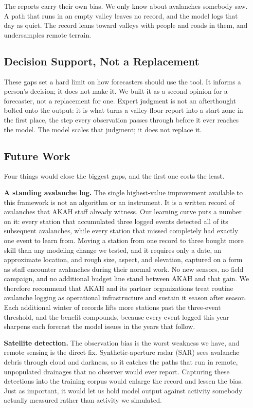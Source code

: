 \documentclass{issw}
\begin{document}
The reports carry their own bias. We only know about avalanches somebody saw. A path that runs in an empty valley leaves no record, and the model logs that day as quiet. The record leans toward valleys with people and roads in them, and undersamples remote terrain.

\subsection{Decision Support, Not a Replacement}
These gaps set a hard limit on how forecasters should use the tool. It informs a person's decision; it does not make it. We built it as a second opinion for a forecaster, not a replacement for one. Expert judgment is not an afterthought bolted onto the output: it is what turns a valley-floor report into a start zone in the first place, the step every observation passes through before it ever reaches the model. The model scales that judgment; it does not replace it.

\subsection{Future Work}
Four things would close the biggest gaps, and the first one costs the least.

\textbf{A standing avalanche log.} The single highest-value improvement available to this framework is not an algorithm or an instrument. It is a written record of avalanches that AKAH staff already witness. Our learning curve puts a number on it: every station that accumulated three logged events detected all of its subsequent avalanches, while every station that missed completely had exactly one event to learn from. Moving a station from one record to three bought more skill than any modeling change we tested, and it requires only a date, an approximate location, and rough size, aspect, and elevation, captured on a form as staff encounter avalanches during their normal work. No new sensors, no field campaign, and no additional budget line stand between AKAH and that gain. We therefore recommend that AKAH and its partner organizations treat routine avalanche logging as operational infrastructure and sustain it season after season. Each additional winter of records lifts more stations past the three-event threshold, and the benefit compounds, because every event logged this year sharpens each forecast the model issues in the years that follow.

\textbf{Satellite detection.} The observation bias is the worst weakness we have, and remote sensing is the direct fix. Synthetic-aperture radar (SAR) sees avalanche debris through cloud and darkness, so it catches the paths that run in remote, unpopulated drainages that no observer would ever report. Capturing these detections into the training corpus would enlarge the record and lessen the bias. Just as important, it would let us hold model output against activity somebody actually measured rather than activity we simulated.
\end{document}
